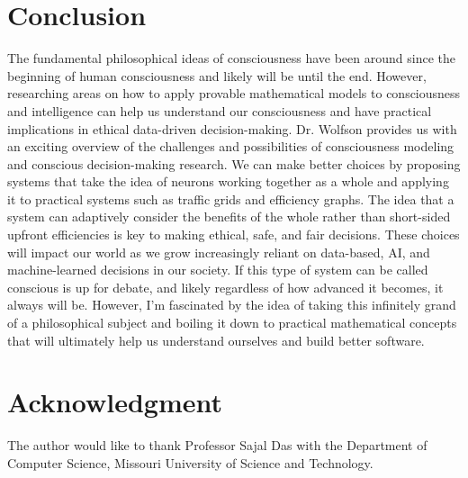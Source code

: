 \documentclass[journal,onecolumn]{IEEEtran}
\begin{document}
\section{Conclusion}

The fundamental philosophical ideas of consciousness have been around since the beginning of human consciousness and likely will be until the end. However, researching areas on how to apply provable mathematical models to consciousness and intelligence can help us understand our consciousness and have practical implications in ethical data-driven decision-making. Dr. Wolfson provides us with an exciting overview of the challenges and possibilities of consciousness modeling and conscious decision-making research. We can make better choices by proposing systems that take the idea of neurons working together as a whole and applying it to practical systems such as traffic grids and efficiency graphs. The idea that a system can adaptively consider the benefits of the whole rather than short-sided upfront efficiencies is key to making ethical, safe, and fair decisions. These choices will impact our world as we grow increasingly reliant on data-based, AI, and machine-learned decisions in our society. If this type of system can be called conscious is up for debate, and likely regardless of how advanced it becomes, it always will be. However, I'm fascinated by the idea of taking this infinitely grand of a philosophical subject and boiling it down to practical mathematical concepts that will ultimately help us understand ourselves and build better software. 




\section*{Acknowledgment}
The author would like to thank Professor Sajal Das with the Department of Computer Science, Missouri University of Science and Technology.
\end{document}
